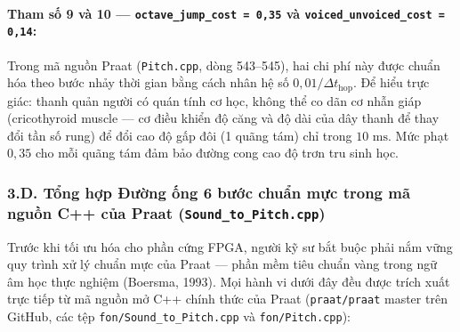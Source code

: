 \documentclass[11pt,a4paper]{article}
\begin{document}
\paragraph{Tham số 9 và 10 --- \texttt{octave\_jump\_cost = 0,35} và \texttt{voiced\_unvoiced\_cost = 0,14}:}
Trong mã nguồn Praat (\texttt{Pitch.cpp}, dòng 543--545), hai chi phí này được chuẩn hóa theo bước nhảy thời gian bằng cách nhân hệ số $0{,}01 / \Delta t_{\text{hop}}$.
Để hiểu trực giác: thanh quản người có quán tính cơ học, không thể co dãn cơ nhẫn giáp (cricothyroid muscle --- cơ điều khiển độ căng và độ dài của dây thanh để thay đổi tần số rung) để đổi cao độ gấp đôi (1 quãng tám) chỉ trong $10\text{ ms}$. Mức phạt $0{,}35$ cho mỗi quãng tám đảm bảo đường cong cao độ trơn tru sinh học.

\subsubsection*{3.D. Tổng hợp Đường ống 6 bước chuẩn mực trong mã nguồn C++ của Praat (\texttt{Sound\_to\_Pitch.cpp})}

Trước khi tối ưu hóa cho phần cứng FPGA, người kỹ sư bắt buộc phải nắm vững quy trình xử lý chuẩn mực của Praat --- phần mềm tiêu chuẩn vàng trong ngữ âm học thực nghiệm (Boersma, 1993). Mọi hành vi dưới đây đều được trích xuất trực tiếp từ mã nguồn mở C++ chính thức của Praat (\texttt{praat/praat} master trên GitHub, các tệp \texttt{fon/Sound\_to\_Pitch.cpp} và \texttt{fon/Pitch.cpp}):
\end{document}
